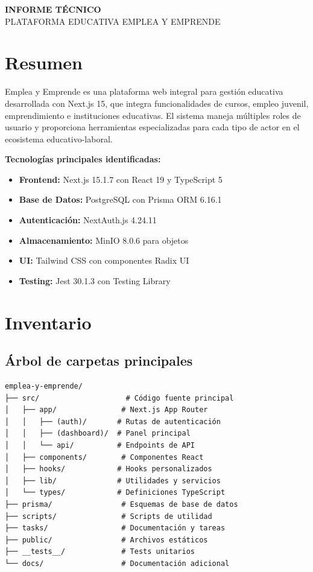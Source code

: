\documentclass[12pt,a4paper]{article}
\begin{document}
\begin{titlepage}
    \centering
    \vspace*{4cm}

    {\Huge\bfseries INFORME TÉCNICO\\[0.5cm]}
    {\LARGE PLATAFORMA EDUCATIVA EMPLEA Y EMPRENDE}

    \vfill

\end{titlepage}

\newpage

\section{Resumen}

Emplea y Emprende es una plataforma web integral para gestión educativa desarrollada con Next.js 15, que integra funcionalidades de cursos, empleo juvenil, emprendimiento e instituciones educativas. El sistema maneja múltiples roles de usuario y proporciona herramientas especializadas para cada tipo de actor en el ecosistema educativo-laboral.

\textbf{Tecnologías principales identificadas:}
\begin{itemize}
    \item \textbf{Frontend:} Next.js 15.1.7 con React 19 y TypeScript 5
    \item \textbf{Base de Datos:} PostgreSQL con Prisma ORM 6.16.1
    \item \textbf{Autenticación:} NextAuth.js 4.24.11
    \item \textbf{Almacenamiento:} MinIO 8.0.6 para objetos
    \item \textbf{UI:} Tailwind CSS con componentes Radix UI
    \item \textbf{Testing:} Jest 30.1.3 con Testing Library
\end{itemize}

\section{Inventario}

\subsection{Árbol de carpetas principales}

\begin{verbatim}
emplea-y-emprende/
├── src/                    # Código fuente principal
│   ├── app/               # Next.js App Router
│   │   ├── (auth)/       # Rutas de autenticación
│   │   ├── (dashboard)/  # Panel principal
│   │   └── api/          # Endpoints de API
│   ├── components/        # Componentes React
│   ├── hooks/            # Hooks personalizados
│   ├── lib/              # Utilidades y servicios
│   └── types/            # Definiciones TypeScript
├── prisma/                # Esquemas de base de datos
├── scripts/               # Scripts de utilidad
├── tasks/                 # Documentación y tareas
├── public/                # Archivos estáticos
├── __tests__/             # Tests unitarios
└── docs/                  # Documentación adicional
\end{verbatim}
\end{document}
